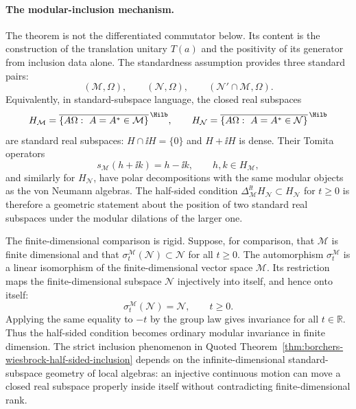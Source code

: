 \paragraph{The modular-inclusion mechanism.}
The theorem is not the differentiated commutator below.  Its content is the
construction of the translation unitary \(T(a)\) and the positivity of its
generator from inclusion data alone.  The standardness assumption provides
three standard pairs:
\[
  (\mathcal M,\Omega),\qquad
  (\mathcal N,\Omega),\qquad
  (\mathcal N'\cap\mathcal M,\Omega).
\]
Equivalently, in standard-subspace language, the closed real subspaces
\[
  H_{\mathcal M}
  =
  \overline{\{A\Omega:\ A=A^*\in\mathcal M\}}^{\,\Hilb},
  \qquad
  H_{\mathcal N}
  =
  \overline{\{A\Omega:\ A=A^*\in\mathcal N\}}^{\,\Hilb}
\]
are standard real subspaces: \(H\cap\ii H=\{0\}\) and
\(H+\ii H\) is dense.  Their Tomita operators
\[
  s_{\mathcal M}(h+\ii k)=h-\ii k,\qquad h,k\in H_{\mathcal M},
\]
and similarly for \(H_{\mathcal N}\), have polar decompositions with the same
modular objects as the von Neumann algebras.  The half-sided condition
\(\Delta_{\mathcal M}^{\ii t}H_{\mathcal N}\subset H_{\mathcal N}\) for
\(t\ge0\) is therefore a geometric statement about the position of two
standard real subspaces under the modular dilations of the larger one.

The finite-dimensional comparison is rigid.  Suppose, for comparison, that
\(\mathcal M\) is finite
dimensional and that
\(\sigma_t^{\mathcal M}(\mathcal N)\subset\mathcal N\) for all \(t\ge0\).
The automorphism \(\sigma_t^{\mathcal M}\) is a linear isomorphism of the
finite-dimensional vector space \(\mathcal M\).  Its restriction maps the
finite-dimensional subspace \(\mathcal N\) injectively into itself, and hence
onto itself:
\[
  \sigma_t^{\mathcal M}(\mathcal N)=\mathcal N,\qquad t\ge0 .
\]
Applying the same equality to \(-t\) by the group law gives invariance for all
\(t\in\mathbb R\).  Thus the half-sided condition becomes ordinary modular
invariance in finite dimension.  The strict inclusion phenomenon in Quoted
Theorem~\ref{thm:borchers-wiesbrock-half-sided-inclusion} depends on the
infinite-dimensional standard-subspace geometry of local algebras: an
injective continuous motion can move a closed real subspace properly inside
itself without contradicting finite-dimensional rank.

